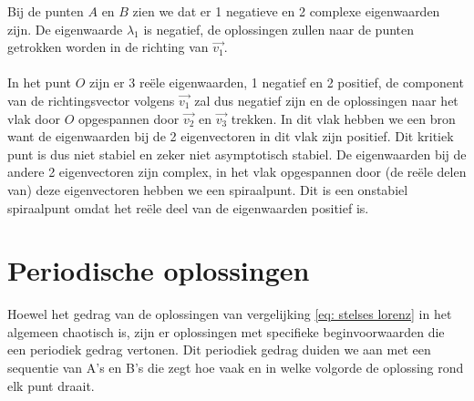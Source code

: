 \documentclass[12pt, a4paper]{article}
\theoremstyle{definition}
\begin{document}
Bij de punten $A$ en $B$ zien we dat er 1 negatieve en 2 complexe eigenwaarden zijn. De eigenwaarde $\lambda_1$ is negatief, de oplossingen zullen naar de punten getrokken worden in de richting van $\Vec{v_1}$. \\
\\
In het punt $O$ zijn er 3 reële eigenwaarden, 1 negatief en 2 positief, de component van de richtingsvector volgens $\Vec{v_1}$ zal dus negatief zijn en de oplossingen naar het vlak door $O$ opgespannen door $\Vec{v_2}$ en $\Vec{v_3}$ trekken. In dit vlak hebben we een bron want de eigenwaarden bij de 2 eigenvectoren in dit vlak zijn positief. Dit kritiek punt is dus niet stabiel en zeker niet asymptotisch stabiel. De eigenwaarden bij de andere 2 eigenvectoren zijn complex, in het vlak opgespannen door (de reële delen van) deze eigenvectoren hebben we een spiraalpunt. Dit is een onstabiel spiraalpunt omdat het reële deel van de eigenwaarden positief is.



\section{Periodische oplossingen}
Hoewel het gedrag van de oplossingen van vergelijking \ref{eq: stelses lorenz} in het algemeen chaotisch is, zijn er oplossingen met specifieke beginvoorwaarden die een periodiek gedrag vertonen. Dit periodiek gedrag duiden we aan met een sequentie van A's en B's die zegt hoe vaak en in welke volgorde de oplossing rond elk punt draait.
\end{document}
